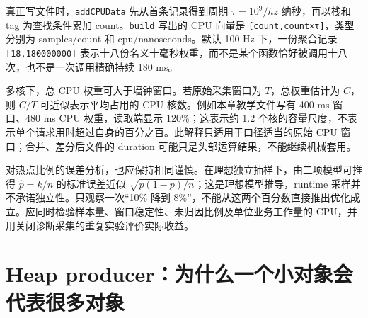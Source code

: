 \documentclass[UTF8,fontset=fandol,openany,11pt]{ctexbook}
\begin{document}
真正写文件时，\texttt{addCPUData} 先从首条记录得到周期 \(\tau=10^9/hz\) 纳秒，再以栈和 tag 为查找条件累加 count。\texttt{build} 写出的 CPU 向量是 \texttt{[count,\allowbreak{}count×τ]}，类型分别为 samples/count 和 cpu/nanoseconds。默认 100 Hz 下，一份聚合记录 \texttt{[18,\allowbreak{}180000000]} 表示十八份名义十毫秒权重，而不是某个函数恰好被调用十八次，也不是一次调用精确持续 180 ms。\cite{pp-cpu-builder}


多核下，总 CPU 权重可大于墙钟窗口。若原始采集窗口为 \(T\)，总权重估计为 \(C\)，则 \(C/T\) 可近似表示平均占用的 CPU 核数。例如本章教学文件写有 400 ms 窗口、480 ms CPU 权重，读取端显示 120\%；这表示约 1.2 个核的容量尺度，不表示单个请求用时超过自身的百分之百。此解释只适用于口径适当的原始 CPU 窗口；合并、差分后文件的 duration 可能只是头部运算结果，不能继续机械套用。\cite{pp-cpu-builder}\cite{pp-merge}\cite{pp-teaching}


对热点比例的误差分析，也应保持相同谨慎。在理想独立抽样下，由二项模型可推得 \(\hat p=k/n\) 的标准误差近似 \(\sqrt{p(1-p)/n}\)；这是理想模型推导，runtime 采样并不承诺独立性。只观察一次“10\% 降到 8\%”，不能从这两个百分数直接推出优化成立。应同时检验样本量、窗口稳定性、未归因比例及单位业务工作量的 CPU，并用关闭诊断采集的重复实验评价实际收益。\cite{pp-cpu-linux}\cite{pp-cpu-runtime}


\section{Heap producer：为什么一个小对象会代表很多对象}
\end{document}
